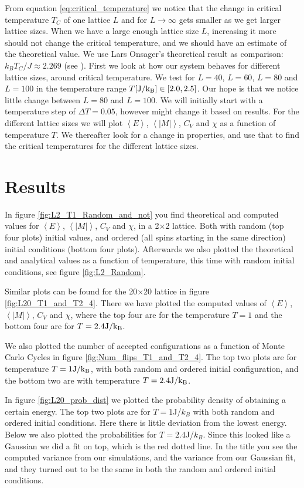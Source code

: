 \documentclass[reprint, english,notitlepage,nofootinbib]{revtex4-1}  %
\begin{document}
From equation \eqref{eq:critical_temperature} we notice that the change in critical temperature $T_C$ of one lattice $L$ and for $L\rightarrow\infty$ gets smaller as we get larger lattice sizes. When we have a large enough lattice size $L$, increasing it more should not change the critical temperature, and we should have an estimate of the theoretical value. We use Lars Onsager's theoretical result as comparison: $k_BT_C/J \approx 2.269$ (see \cite{larsonsager}). First we look at how our system behaves for different lattice sizes, around critical temperature. We test for $L=40$, $L=60$, $L=80$ and $L=100$ in the temperature range $T[\rm{J}/k_B]\in [2.0, 2.5]$. Our hope is that we notice little change between $L=80$ and $L=100$. We will initially start with a temperature step of $\Delta T = 0.05$, however might change it based on results. For the different lattice sizes we will plot $\left<E\right>$, $\left<|M|\right>$, $C_V$ and $\chi$ as a function of temperature $T$. We thereafter look for a change in properties, and use that to find the critical temperatures for the different lattice sizes.

\section{Results}

In figure \ref{fig:L2_T1_Random_and_not} you find theoretical and computed values for $\left<E\right>$, $\left<|M|\right>$, $C_V$ and $\chi$, in a 2$\times$2 lattice. Both with random (top four plots) initial values, and ordered (all spins starting in the same direction) initial conditions (bottom four plots). Afterwards we also plotted the theoretical and analytical values as a function of temperature, this time with random initial conditions, see figure \ref{fig:L2_Random}.

Similar plots can be found for the 20$\times$20 lattice in figure \ref{fig:L20_T1_and_T2_4}. There we have plotted the computed values of $\left<E\right>$, $\left<|M|\right>$, $C_V$ and $\chi$, where the top four are for the temperature $T=1$ and the bottom four are for $T=2.4\rm{J}/k_B$.

We also plotted the number of accepted configurations as a function of Monte Carlo Cycles in figure \ref{fig:Num_flips_T1_and_T2_4}. The top two plots are for temperature $T=1\rm{J}/k_B$, with both random and ordered initial configuration, and the bottom two are with temperature $T=2.4\rm{J}/k_B$.

In figure \ref{fig:L20_prob_dist} we plotted the probability density of obtaining a certain energy. The top two plots are for $T = 1$J/$k_B$ with both random and ordered initial conditions. Here there is little deviation from the lowest energy. Below we also plotted the probabilities for $T = 2.4$J/$k_B$. Since this looked like a Gaussian we did a fit on top, which is the red dotted line. In the title you see the computed variance from our simulations, and the variance from our Gaussian fit, and they turned out to be the same in both the random and ordered initial conditions.
\end{document}
